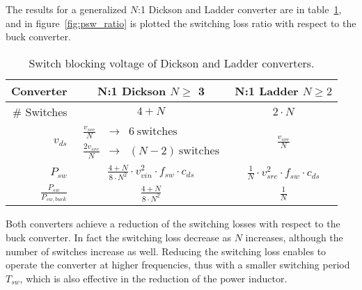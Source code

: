 The results for a generalized $N$:1 Dickson and Ladder converter are in table~\ref{tab:Dick_Ladder_v_blk}, and in figure~\ref{fig:psw_ratio} is plotted the switching loss ratio with respect to the buck converter.
\begin{table}[h]
\centering
\caption{Switch blocking voltage of Dickson and Ladder converters.}
\label{tab:Dick_Ladder_v_blk}
\renewcommand{\arraystretch}{1.5}%
\begin{tabular}{r | c  c   }
 Converter &  N:1 Dickson  $ N \geq$ 3  &  N:1 Ladder $ N \geq 2$  \\
 \midrule
\# Switches & $ 4 + N $  & $2 \cdot N$ \\
 $v_{ds}$ & $\begin{array} {rcl} \frac{v_{src}}{N}   & \to &  6~ \text{switches} \\
                                           \frac{2 v_{src}}{N} & \to &  (N - 2) ~\text{switches}
                       \end{array}$
                       &   $ \frac{v_{src}}{N} $ \\
 $ P_{sw}$ &  $ \frac{4+N}{8 \cdot N^2} \cdot v_{vin}^2 \cdot f_{sw}  \cdot {c_{ds}} $ &  $ \frac{1}{ N} \cdot v_{src}^2 \cdot f_{sw} \cdot {c_{ds}} $  \\
 $ \frac{P_{sw}}{P_{sw,buck}}$ &  $ \frac{4+N}{8 \cdot N^2}  $ &  $ \frac{1}{ N}  $  \\


 \end{tabular}
\end{table}

Both converters achieve a reduction of the switching losses with respect to the buck converter. In fact the switching loss decrease as $N$ increases, although the number of switches increase as well. Reducing the switching loss enables to operate the converter at higher frequencies, thus with a smaller switching period $T_{sw}$, which is also effective in the reduction of the power inductor.

\begin{SCfigure}
\centering
{}
\caption{Switching loss ratio for Dickson and Ladder converters with respect to buck converter.}
\label{fig:psw_ratio}
\end{SCfigure}

